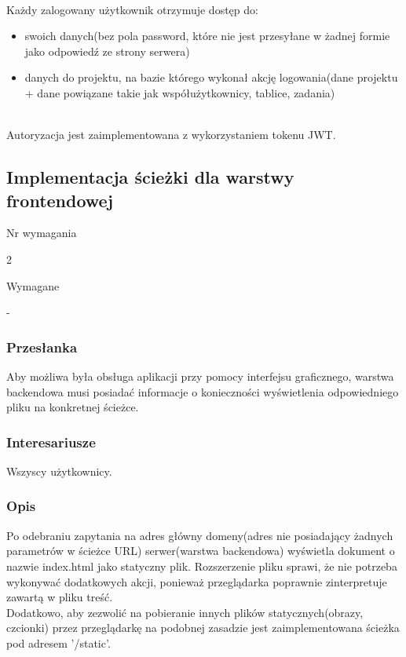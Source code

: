 \documentclass[eng,printmode]{mgr}
\begin{document}
\ \\
Każdy zalogowany użytkownik otrzymuje dostęp do:
\begin{itemize}
  \item[--] swoich danych(bez pola password, które nie jest przesyłane w żadnej formie jako odpowiedź ze strony serwera)
  \item[--] danych do projektu, na bazie którego wykonał akcję logowania(dane projektu + dane powiązane takie jak współużytkownicy, tablice, zadania)
\end{itemize}
\ \\
Autoryzacja jest zaimplementowana z wykorzystaniem tokenu JWT\cite{Keyword_JWTToken}.
\newpage

\subsection{Implementacja ścieżki dla warstwy frontendowej}
\begin{labeling}{Nr wymagania}
\item [Nr wymagania:] 2
\item [Priorytet:] Wymagane
\item [Powiązania:] -
\end{labeling}

\subsubsection{Przesłanka}
Aby możliwa była obsługa aplikacji przy pomocy interfejsu graficznego, warstwa backendowa musi posiadać informacje o konieczności wyświetlenia odpowiedniego pliku na konkretnej ścieżce.


\subsubsection{Interesariusze}
Wszyscy użytkownicy.

\subsubsection{Opis}
Po odebraniu zapytania na adres główny domeny(adres nie posiadający żadnych parametrów w ścieżce URL) serwer(warstwa backendowa) wyświetla dokument o nazwie index.html jako statyczny plik. Rozszerzenie pliku sprawi, że nie potrzeba wykonywać dodatkowych akcji, ponieważ przeglądarka poprawnie zinterpretuje zawartą w pliku treść. \\
Dodatkowo, aby zezwolić na pobieranie innych plików statycznych(obrazy, czcionki) przez przeglądarkę na podobnej zasadzie jest zaimplementowana ścieżka pod adresem '/static'.
\newpage
\end{document}
